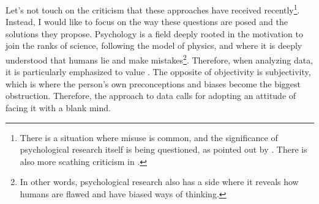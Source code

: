 \documentclass{ltjsbook}
\begin{document}
Let's not touch on the criticism that these approaches have received recently\footnote{There is a situation where misuse is common, and the significance of psychological research itself is being questioned, as pointed out by \textcite{amrhein2019scientists}. There is also more scathing criticism in \textcite{Toyoda202003}.}. Instead, I would like to focus on the way these questions are posed and the solutions they propose. Psychology is a field deeply rooted in the motivation to join the ranks of science, following the model of physics, and where it is deeply understood that humans lie and make mistakes\footnote{In other words, psychological research also has a side where it reveals how humans are flawed and have biased ways of thinking.}. Therefore, when analyzing data, it is particularly emphasized to value . The opposite of objectivity is subjectivity, which is where the person's own preconceptions and biases become the biggest obstruction. Therefore, the approach to data calls for adopting an attitude of facing it with a blank mind.
\end{document}
